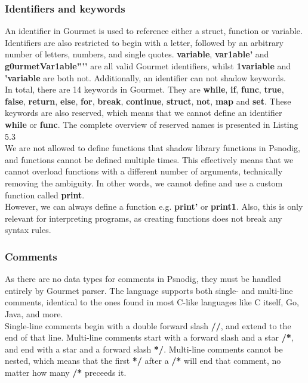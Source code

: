 \subsubsection{Identifiers and keywords}

An identifier in Gourmet is used to reference either a struct, function or variable. Identifiers are also restricted to begin with a letter, followed by an arbitrary number of letters, numbers, and single quotes. \textbf{variable}, \textbf{var1able’} and \textbf{g0urmetVar1able''’'} are all valid Gourmet identifiers, whilst \textbf{1variable} and \textbf{'variable} are both not. Additionally, an identifier can not shadow keywords. \hfill \\

In total, there are 14 keywords in Gourmet. They are \textbf{while}, \textbf{if}, \textbf{func}, \textbf{true}, \textbf{false}, \textbf{return}, \textbf{else}, \textbf{for}, \textbf{break}, \textbf{continue}, \textbf{struct}, \textbf{not}, \textbf{map} and \textbf{set}. These keywords are also reserved, which means that we cannot define an identifier \textbf{while} or \textbf{func}. The complete overview of reserved names is presented in Listing 5.3 \hfill \\

We are not allowed to define functions that shadow library functions in Psnodig, and functions cannot be defined multiple times. This effectively means that we cannot overload functions with a different number of arguments, technically removing the ambiguity. In other words, we cannot define and use a custom function called \textbf{print}. \hfill \\

However, we can always define a function e.g. \textbf{print’} or \textbf{print1}. Also, this is only relevant for interpreting programs, as creating functions does not break any syntax rules.

\subsubsection{Comments}

As there are no data types for comments in Psnodig, they must be handled entirely by Gourmet parser. The language supports both single- and multi-line comments, identical to the ones found in most C-like languages like C itself, Go, Java, and more. \hfill \\

Single-line comments begin with a double forward slash \textbf{//}, and extend to the end of that line. Multi-line comments start with a forward slash and a star \textbf{/*}, and end with a star and a forward slash \textbf{*/}. Multi-line comments cannot be nested, which means that the first \textbf{*/} after a \textbf{/*} will end that comment, no matter how many \textbf{/*} preceeds it. \hfill \\

